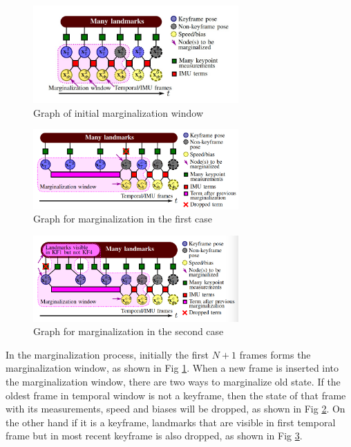 \documentclass[12pt,twoside]{article}
\begin{document}
\begin{figure}[h]
    \centering
    \includegraphics[width=0.7\textwidth]{figures/okvis1}
    \caption{Graph of initial marginalization window \cite{leutenegger2015keyframe}}
    \label{fig:okvis1}
\end{figure}
\begin{figure}[h]
    \centering
    \includegraphics[width=0.7\textwidth]{figures/okvis2}
     \caption{Graph for marginalization in the first case \cite{leutenegger2015keyframe}}
    \label{fig:okvis2}
\end{figure}
\begin{figure}[h]
    \centering
    \includegraphics[width=0.7\textwidth]{figures/okvis3}
   \caption{Graph for marginalization in the second case \cite{leutenegger2015keyframe}}
    \label{fig:okvis3}
\end{figure}
In the marginalization process, initially the first $N+1$ frames forms the marginalization window, as shown in Fig \ref{fig:okvis1}. When a new frame is inserted into the marginalization window, there are two ways to marginalize old state. If the oldest frame in temporal window is not a keyframe, then the state of that frame with its measurements, speed and biases will be dropped, as shown in Fig \ref{fig:okvis2}. On the other hand if it is a keyframe, landmarks that are visible in first temporal frame but in most recent keyframe is also dropped, as shown in Fig \ref{fig:okvis3}.\\
\end{document}
